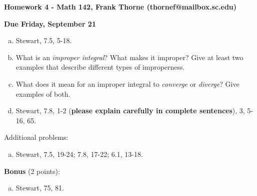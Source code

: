 \documentclass[12pt]{article}
\begin{document}
\setlength{\topmargin}{-2mm}





\begin{center}{\bf Homework 4 - Math 142, Frank Thorne (thornef@mailbox.sc.edu)}
\end{center}
\begin{center}
{\bf Due Friday, September 21}
\end{center}
\begin{enumerate}[(a)]

\item
Stewart, 7.5, 5-18.
\item
What is an {\itshape improper integral}? What makes it improper? Give at least two 
examples that describe different types of improperness.
\item
What does it mean for an improper integral to {\itshape converge} or {\itshape diverge}?
Give examples of both.
\item
Stewart, 7.8, 1-2 ({\bf please explain carefully in complete sentences}), 3, 5-16, 65.
\end{enumerate}

Additional problems:

\begin{enumerate}[(a)]
\item
Stewart, 7.5, 19-24; 7.8, 17-22; 6.1, 13-18.
\end{enumerate}
{\bf Bonus} (2 points):
\begin{enumerate}[(a)]
\item
Stewart, 75, 81.
\end{enumerate}
\end{document}
